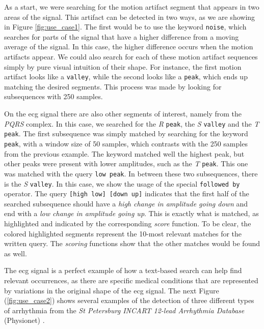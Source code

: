 As a start, we were searching for the motion artifact segment that appears in two areas of the signal. This artifact can be detected in two ways, as we are showing in Figure \ref{fig:use_case1}. The first would be to use the keyword \texttt{noise}, which searches for parts of the signal that have a higher difference from a moving average of the signal. In this case, the higher difference occurs when the motion artifacts appear. We could also search for each of these motion artifact sequences simply by pure visual intuition of their shape. For instance, the first motion artifact looks like a \texttt{valley}, while the second looks like a \texttt{peak}, which ends up matching the desired segments. This process was made by looking for subsequences with 250 samples.
\par
On the \gls{ecg} signal there are also other segments of interest, namely from the \textit{PQRS} complex. In this case, we searched for the \textit{R} \texttt{peak}, the \textit{S} \texttt{valley} and the \textit{T} \texttt{peak}. The first subsequence was simply matched by searching for the keyword \texttt{peak}, with a window size of 50 samples, which contrasts with the 250 samples from the previous example. The keyword matched well the highest peak, but other peaks were present with lower amplitudes, such as the \textit{T} \texttt{peak}. This one was matched with the query \texttt{low peak}. In between these two subsequences, there is the \textit{S} \texttt{valley}. In this case, we show the usage of the special \texttt{followed by} operator. The query \texttt{[high low] [down up]} indicates that the first half of the searched subsequence should have a \textit{high change in amplitude going down} and end with a \textit{low change in amplitude going up}. This is exactly what is matched, as highlighted and indicated by the corresponding \textit{score} function. To be clear, the colored highlighted segments represent the 10-most relevant matches for the written query. The \textit{scoring} functions show that the other matches would be found as well.
\par
The \gls{ecg} signal is a perfect example of how a text-based search can help find relevant occurrences, as there are specific medical conditions that are represented by variations in the original shape of the \gls{ecg} signal. The next Figure (\ref{fig:use_case2}) shows several examples of the detection of three different types of arrhythmia from the \textit{St Petersburg INCART 12-lead Arrhythmia Database} (Physionet) \cite{PhysioNet}.

